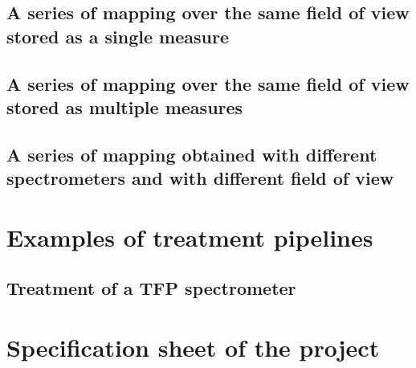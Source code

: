 \documentclass{book}
\begin{document}
    \section{A series of mapping over the same field of view stored as a single measure}
        
    
    \section{A series of mapping over the same field of view stored as multiple measures}
        
    
    \section{A series of mapping obtained with different spectrometers and with different field of view}
        

\chapter{Examples of treatment pipelines}
    \section{Treatment of a TFP spectrometer} \label{subsec:example_treatment.TFP}
        
        

\chapter{Specification sheet of the project}
    
\end{document}
